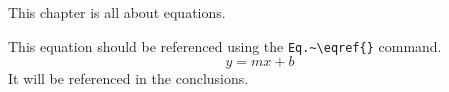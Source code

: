This chapter is all about equations.

\label{sec:equations}\par
This equation should be referenced using the \verb|Eq.~\eqref{}| command.
\begin{equation}\label{eqn:example}
y=mx+b
\end{equation}
It will be referenced in the conclusions.
